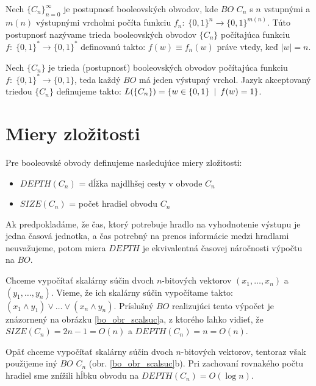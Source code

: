 \begin{definicia}
  Nech $\{C_n\}_{n=0}^{\infty}$ je postupnosť booleovských obvodov,
  kde $BO$ $C_n$ s $n$ vstupnými a $m(n)$ výstupnými vrcholmi počíta
  funkciu $f_n:\; \{ 0,1\}^n\rightarrow\{ 0,1 \}^{m(n)}$. Túto
  postupnosť nazývame trieda booleovských obvodov $\{ C_n\}$
  počítajúca funkciu $f:\; \{ 0,1\}^*\rightarrow\{ 0,1\}^*$
  definovanú takto: $f(w)\equiv f_n(w)$ práve vtedy, keď $|w|=n$.
\end{definicia}

\begin{definicia}
  Nech $\{ C_n\}$ je trieda (postupnosť) booleovských obvodov
  počítajúca funkciu \\ $f:\; \{ 0,1\}^*\rightarrow\{ 0,1\}$, teda
  každý $BO$ má jeden výstupný vrchol. Jazyk akceptovaný triedou $\{
  C_n\}$ definujeme takto: $L(\{ C_n\})=\{ w\in\{ 0,1\}\enspace |\enspace
  f(w)=1\}$.
\end{definicia}

\section{Miery zložitosti}

Pre booleovské obvody definujeme nasledujúce miery zložitosti:
\begin{itemize}
  \item $DEPTH(C_n)$ = dĺžka najdlhšej cesty v obvode $C_n$
  \item $SIZE(C_n)$ = počet hradiel obvodu $C_n$
\end{itemize}

Ak predpokladáme, že čas, ktorý potrebuje hradlo na vyhodnotenie
výstupu je jedna časová jednotka, a čas potrebný na prenos
informácie medzi hradlami neuvažujeme, potom miera $DEPTH$ je
ekvivalentná časovej náročnosti výpočtu na $BO$.

\begin{priklad}
  Chceme vypočítať skalárny súčin dvoch $n$-bitových vektorov
  $(x_1,\dots ,x_n)$ a \linebreak $(y_1,\dots ,y_n)$. Vieme, že ich
  skalárny súčin vypočítame takto: $(x_1\wedge y_1)\vee\dots\vee
  (x_n\wedge y_n)$. \linebreak Príslušný $BO$ realizujúci tento
  výpočet je znázornený na obrázku \ref{bo_obr_scalsuc}a, z ktorého ľahko \linebreak
  vidieť, že $SIZE(C_n)=2n-1=O(n)$ a $DEPTH(C_n)=n=O(n)$.
\end{priklad}

\begin{priklad}
  \label{bo_prikl_2}

  Opäť chceme vypočítať skalárny súčin dvoch $n$-bitových vektorov,
  tentoraz však použijeme iný $BO$ $C_n$ (obr. \ref{bo_obr_scalsuc}b). Pri
  zachovaní rovnakého počtu hradiel sme znížili hĺbku obvodu na
  $DEPTH(C_n)=O(\log n)$.
\end{priklad}

